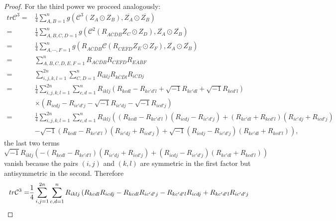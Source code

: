 \documentclass{amsart}
\theoremstyle{definition}
\theoremstyle{remark}
\numberwithin{equation}{section}
\begin{document}
\begin{proof}
For the third power we proceed analogously:
\begin{align*}
  tr{\mathcal{C}^3} =& \frac{1}{4}\sum\limits_{A,B = 1}^n {g\left( {{\mathcal{C}^3}\left( {{Z_A} \odot {Z_B}} \right),\overline {{Z_A}}  \odot \overline {{Z_B}} } \right)}\\
   =& \frac{1}{4}\sum\limits_{A,B,C,D = 1}^n {g\left( {{\mathcal{C}^2}\left( {{R_{A\overline C \overline D B}}{Z_C} \odot {Z_D}} \right),\overline {{Z_A}}  \odot \overline {{Z_B}} } \right)}  \\
   =& \frac{1}{4}\sum\limits_{A, \cdots ,F = 1}^n {g\left( {{R_{A\overline C \overline D B}}\mathcal{C}\left( {{R_{C\overline E \overline F D}}{Z_E} \odot {Z_F}} \right),\overline {{Z_A}}  \odot \overline {{Z_B}} } \right)}\\
   =& \sum\limits_{A,B,C,D,E,F = 1}^n {{R_{A\overline C \overline D B}}{R_{C\overline E \overline F D}}{R_{E\overline A \overline B F}}}   \\
   =& \sum\limits_{i,j,k,l = 1}^{2n} {\sum\limits_{C,D = 1}^n {{R_{iklj}}{R_{k\overline C \overline D l}}{R_{iCDj}}} }\\
   =& \frac{1}{4}\sum\limits_{i,j,k,l = 1}^{2n} {\sum\limits_{c,d = 1}^n {{R_{iklj}}\left( {{R_{kcdl}} - {R_{kc'd'l}} + \sqrt { - 1} {R_{kc'dl}} + \sqrt { - 1} {R_{kcd'l}}} \right)}}\\
    &\times{{\left( {{R_{icdj}} - {R_{ic'd'j}} - \sqrt { - 1} {R_{ic'dj}} - \sqrt { - 1} {R_{icd'j}}} \right)} }   \\
   =& \frac{1}{4} \sum\limits_{i,j,k,l = 1}^{2n} {\sum\limits_{c,d = 1}^n {{R_{iklj}}\left( {\left( {{R_{kcdl}} - {R_{kc'd'l}}} \right)\left( {{R_{icdj}} - {R_{ic'd'j}}} \right) + \left( {{R_{kc'dl}} + {R_{kcd'l}}} \right)\left( {{R_{ic'dj}} + {R_{icd'j}}} \right)} \right.} }   \\
  &\left. { - \sqrt { - 1} \left( {{R_{kcdl}} - {R_{kc'd'l}}} \right)\left( {{R_{ic'dj}} + {R_{icd'j}}} \right) + \sqrt { - 1} \left( {{R_{icdj}} - {R_{ic'd'j}}} \right)\left( {{R_{kc'dl}} + {R_{kcd'l}}} \right)} \right) ,
\end{align*}
the last two terms
$${\sqrt { - 1} }{{R_{iklj}}\left( - {\left( {{R_{kcdl}} - {R_{kc'd'l}}} \right)\left( {{R_{ic'dj}} + {R_{icd'j}}} \right) +  \left( {{R_{icdj}} - {R_{ic'd'j}}} \right)\left( {{R_{kc'dl}} + {R_{kcd'l}}} \right)} \right)}$$
vanish because the pairs
 $\left( {i,j} \right)$ and $\left( {k,l} \right)$ are symmetric in the first factor but antisymmetric in the second. Therefore
\begin{align*}
   tr{\mathcal{C}^3} =& \frac{1}{4} \sum\limits_{i,j = 1}^{2n} {\sum\limits_{c,d = 1}^n {{R_{iklj}}\left( {{R_{kcdl}}{R_{icdj}} - {R_{kcdl}}{R_{ic'd'j}} - {R_{kc'd'l}}{R_{icdj}} + {R_{kc'd'l}}{R_{ic'd'j}}} \right.} }  \hfill \\

\end{align*}
\end{proof}
\end{document}
